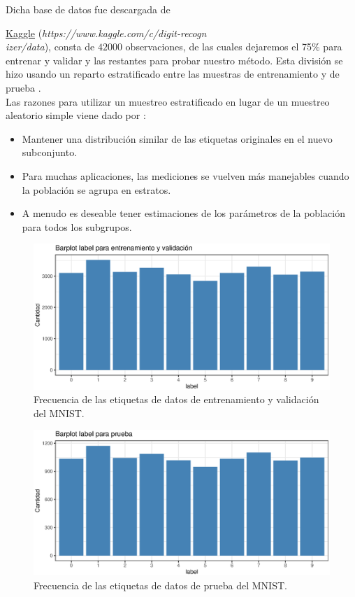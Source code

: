 \documentclass[12pt]{report} %
\theoremstyle{definition}
\begin{document}
Dicha base de datos fue descargada de {\href{https://www.kaggle.com/c/digit-recognizer/data}{\underline{Kaggle}} (\emph{https://www.kaggle.com/c/digit-recogn}\\  
\emph{izer/data}), consta de $42000$ observaciones, de las cuales dejaremos el 75$\%$ para entrenar y validar y las restantes para probar nuestro método. Esta división se hizo usando un reparto estratificado entre las muestras de entrenamiento y de prueba \cite{caret}.\\

Las razones para utilizar un muestreo estratificado en lugar de un muestreo aleatorio simple viene dado por \cite{hyndmandatapartition}:

\begin{itemize}
\item Mantener una distribución similar de las etiquetas originales en el nuevo subconjunto.
\item Para muchas aplicaciones, las mediciones se vuelven más manejables cuando la población se agrupa en estratos.
\item A menudo es deseable tener estimaciones de los parámetros de la población para todos los subgrupos.
\end{itemize}

\begin{figure}[H]
	\centering
	\includegraphics[scale=0.6]{imagenes/mnisttrain.eps}
	\caption{Frecuencia de las etiquetas de datos de entrenamiento y validación del MNIST.}
	\label{fig:label1}
\end{figure}

\begin{figure}[H]
	\centering
	\includegraphics[scale=0.6]{imagenes/mnisttest.eps}
	\caption{Frecuencia de las etiquetas de datos de prueba del MNIST.}
	\label{fig:label2}
\end{figure}

}
\end{document}
